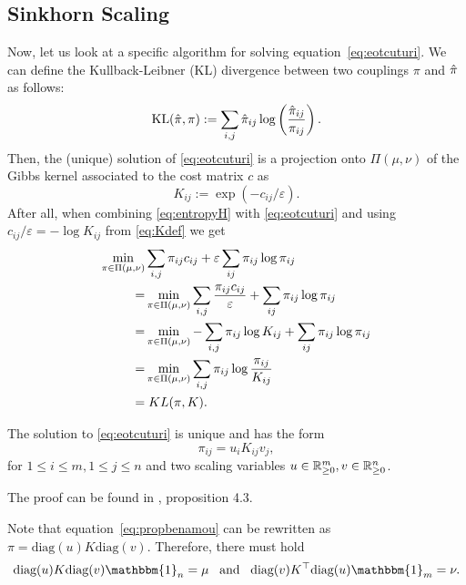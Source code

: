 \subsection{Sinkhorn Scaling}
\label{sec:sinkhorn}
Now, let us look at a specific algorithm for solving equation~\eqref{eq:eotcuturi}. We can define the Kullback-Leibner (KL) divergence between two couplings $\pi$ and $\hat{\pi}$ as follows:
\begin{equation}
	\text{KL}(\hat{\pi}, \pi) := \sum_{i,j} \hat{\pi}_{ij} \log\left(\frac{\hat{\pi}_{ij}}{\pi_{ij}}\right).
	\label{eq:KLdef}
\end{equation}
Then, the (unique) solution of \eqref{eq:eotcuturi} is a projection onto $\Pi(\mu, \nu)$ of the Gibbs kernel associated to the cost matrix $c$ as 
\begin{equation}
	K_{ij} := \exp\left(-c_{ij}/\varepsilon\right). 
	\label{eq:Kdef}
\end{equation}
After all, when combining \eqref{eq:entropyH} with \eqref{eq:eotcuturi} and using $c_{ij}/\varepsilon = -\log K_{ij}$ from \eqref{eq:Kdef} we get
\begin{align*}
	\min_{\pi \in \Pi(\mu, \nu)}  &\sum_{i,j} \pi_{ij} c_{ij}  + \varepsilon \sum_{ij} \pi_{ij} \log \pi_{ij} \\
	= &\min_{\pi \in \Pi(\mu, \nu)}  \sum_{i,j} \frac{\pi_{ij} c_{ij}}{\varepsilon} + \sum_{ij} \pi_{ij} \log \pi_{ij} \\
	= &\min_{\pi \in \Pi(\mu, \nu)} -\sum_{i,j} \pi_{ij} \log K_{ij}  + \sum_{ij} \pi_{ij} \log \pi_{ij} \\
	= &\min_{\pi \in \Pi(\mu, \nu)}  \sum_{i,j} \pi_{ij} \log \frac{\pi_{ij}}{K_{ij}}  \\
	= &\;  KL(\pi, K).
\end{align*}
\vspace{0.3cm}
\begin{proposition}
	The solution to \eqref{eq:eotcuturi} is unique and has the form 
	\begin{equation}
		\pi_{ij} = u_i K_{ij} v_j,
		\label{eq:propbenamou}
	\end{equation}
	for $1 \leq i \leq m, 1 \leq j \leq n$ and two scaling variables $u \in \mathbb{R}^m_{\geq 0}, v \in \mathbb{R}^n_{\geq 0}$. 
\end{proposition}
The proof can be found in \citet{peyre2020}, proposition 4.3. \par 
Note that equation~\eqref{eq:propbenamou} can be rewritten as $\pi = \text{diag}(u) K \text{diag}(v)$. Therefore, there must hold 
\begin{equation}
	\text{diag}(u)K\text{diag}(v) \mathbbm{1}_n = \mu \;\;\; \text{and} \;\;\; \text{diag}(v) K^\top \text{diag}(u) \mathbbm{1}_m = \nu.
	\label{eq:ukvdiag}
\end{equation}
